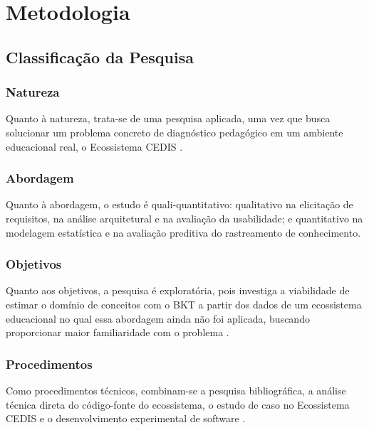 
\chapter[Metodologia]{Metodologia}
\label{cap:metodologia}

\section{Classificação da Pesquisa}
\label{sec:classificacao-pesquisa}

\subsection{Natureza}
\label{subsec:natureza}

Quanto à natureza, trata-se de uma pesquisa aplicada, uma vez que busca solucionar um problema concreto de diagnóstico pedagógico em um ambiente educacional real, o Ecossistema CEDIS \cite{gil_como_2022, wazlawick_metodologia_2020}.

\subsection{Abordagem}
\label{subsec:abordagem}

Quanto à abordagem, o estudo é quali-quantitativo: qualitativo na elicitação de requisitos, na análise arquitetural e na avaliação da usabilidade; e quantitativo na modelagem estatística e na avaliação preditiva do rastreamento de conhecimento.

\subsection{Objetivos}
\label{subsec:classificacao-objetivos}

Quanto aos objetivos, a pesquisa é exploratória, pois investiga a viabilidade de estimar o domínio de conceitos com o BKT a partir dos dados de um ecossistema educacional no qual essa abordagem ainda não foi aplicada, buscando proporcionar maior familiaridade com o problema \cite{gil_como_2022}.

\subsection{Procedimentos}
\label{subsec:procedimentos}

Como procedimentos técnicos, combinam-se a pesquisa bibliográfica, a análise técnica direta do código-fonte do ecossistema, o estudo de caso no Ecossistema CEDIS e o desenvolvimento experimental de software \cite{wazlawick_metodologia_2020}.


